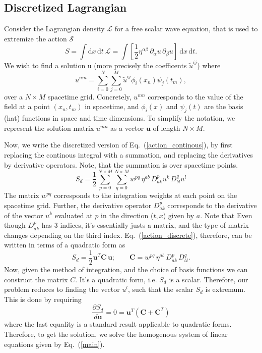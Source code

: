 \documentclass[nofootinbib,preprintnumbers,superscriptaddress,notitlepage]{revtex4-1}
\newcommand{\<}{\begin{equation}}
\newcommand{\?}{\end{equation}}
\begin{document}
\subsection{Discretized Lagrangian}
Consider the Lagrangian density $\mathcal{L}$ for a free scalar wave equation,
that is used to extremize the action $\mathcal{S}$
\begin{equation}
\label{action_continous}
S = \int \textrm{d}x\,\textrm{d}t~\mathcal{L} =  \int  \left[\dfrac{1}{2} \eta^{\alpha \beta}\, \partial_{\alpha} u\, \partial_{\beta} u\right]~ \textrm{d}x\,\textrm{d}t.
\end{equation}
We wish to find a solution u (more precisely the coefficents $\tilde{u}^{ij}$)
where
\begin{equation}
\label{spectral_expansion}
u^{nm} = \sum\limits_{i=0}^N\sum\limits_{j=0}^{M} \tilde{u}^{ij} \phi_i(x_n)\psi_j(t_m),
\end{equation}
over a $N\times M$ spacetime grid. Concretely, $u^{mn}$ corresponds to the
value of the field at a point $(x_n, t_m)$ in spacetime, and $\phi_i(x)$ and
$\psi_j(t)$ are the basis (hat) functions in space and time dimensions. To
simplify the notation, we represent the solution matrix $u^{mn}$ as a vector
$\mathbf{u}$ of length $N \times M$.

Now, we write the discretized version of Eq.~(\ref{action_continous}), by
first replacing the continous integral with a summation, and replacing the
derivatives by derivative operators. Note, that the summation is over
spacetime points.
\begin{equation}
\label{action_discrete}
S_d = \dfrac{1}{2} \sum\limits_{p=0}^{N\times M}\sum\limits_{q=0}^{N\times M} w^{pq}\, \eta^{ab} \, D_{ak}^p u^{k}\, D_{bl}^q u^{l} 
\end{equation}
The matrix $w^{pq}$ corresponds to the integration weights at each point on
the spacetime grid. Further, the derivative operator $D^p_{ak}$ corresponds to
the derivative of the vector $u^k$ evaluated at $p$ in the direction ($t,x$)
given by $a$. Note that Even though $D^p_{ak}$ has 3 indices, it's essentially
justs a matrix, and the type of matrix changes depending on the third index.
Eq.~(\ref{action_discrete}), therefore, can be written in terms of a quadratic
form as
\begin{equation}
S_d = \dfrac{1}{2} \mathbf{u}^T \mathbf{C}\, \mathbf{u}; \qquad \mathbf{C} = w^{pq}\, \eta^{ab} \, D_{ak}^p \, D_{bl}^q.
\end{equation}
\label{main}
Now, given the method of integration, and the choice of basis functions we can
construct the matrix $C$. It's a quadratic form, i.e. $S_d$ is a scalar.
Therefore, our problem reduces to finding the vector $u^l$, such that the
scalar $S_d$ is extremum. This is done by requiring
\begin{equation}
\dfrac{\partial S_d}{d\mathbf{u}} = 0 = \mathbf{u}^T (\mathbf{C} + \mathbf{C}^T)
\end{equation}
where the last equality is a standard result applicable to quadratic forms.
Therefore, to get the solution, we solve the homogenous system of linear
equations given by Eq.~(\ref{main}).


\end{document}
